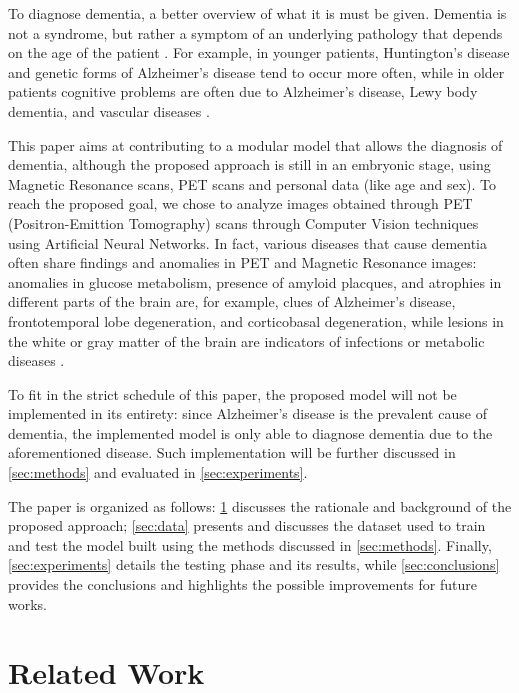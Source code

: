\documentclass[10pt,twocolumn,letterpaper]{article}
\begin{document}
To diagnose dementia, a better overview of what it is must be given. Dementia is
not a syndrome, but rather a symptom of an underlying pathology that depends on
the age of the patient \cite{Barkhof2016}. For example, in younger patients,
Huntington's disease and genetic forms of Alzheimer's disease tend to occur more
often, while in older patients cognitive problems are often due to Alzheimer's
disease, Lewy body dementia, and vascular diseases
\cite{Barkhof2016,Knopman2006}.

This paper aims at contributing to a modular model that allows the diagnosis of
dementia, although the proposed approach is still in an embryonic stage, using 
Magnetic Resonance scans, PET scans and personal data (like age and sex). To
reach the proposed goal, we chose to analyze images obtained through PET
(Positron-Emittion Tomography) scans through Computer Vision techniques using
Artificial Neural Networks. In fact, various diseases that cause dementia often
share findings and anomalies in PET and Magnetic Resonance images: anomalies in
glucose metabolism, presence of amyloid placques, and atrophies in different
parts of the brain are, for example, clues of Alzheimer's disease,
frontotemporal lobe degeneration, and corticobasal degeneration, while lesions
in the white or gray matter of the brain are indicators of infections or
metabolic diseases \cite{Barkhof2016,Chetelat2020}.

To fit in the strict schedule of this paper, the proposed model will not be
implemented in its entirety: since Alzheimer's disease is the prevalent cause of
dementia, the implemented model is only able to diagnose dementia due to the
aforementioned disease. Such implementation will be further discussed in
\cref{sec:methods} and evaluated in \cref{sec:experiments}.

The paper is organized as follows: \cref{sec:related-work} discusses the
rationale and background of the proposed approach; \cref{sec:data} presents and
discusses the dataset used to train and test the model built using the methods
discussed in \cref{sec:methods}. Finally, \cref{sec:experiments} details the
testing phase and its results, while \cref{sec:conclusions} provides the
conclusions and highlights the possible improvements for future works.

\section{Related Work}
\label{sec:related-work}
\end{document}
